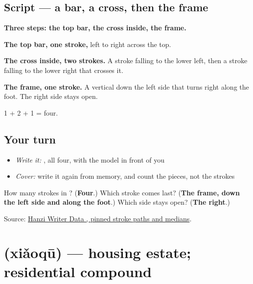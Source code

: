 \subsection*{Script — a bar, a cross, then the frame}

\begin{quote}
\end{quote}

\textbf{Three steps: the top bar, the cross inside, the frame.}

\textbf{The top bar, one stroke,} left to right across the top.

\textbf{The cross inside, two strokes.} A stroke falling to the lower left, then a stroke falling to the lower right that crosses it.

\textbf{The frame, one stroke.} A vertical down the left side that turns right along the foot. The right side stays open.

1 + 2 + 1 = four.

\subsection*{Your turn}
\begin{itemize}
\raggedright
  \item \emph{Write it:} , all four, with the model in front of you
  \item \emph{Cover:} write it again from memory, and count the pieces, not the strokes
\end{itemize}

\begin{tcolorbox}[breakable,colback=teal!4,colframe=teal!35!black,title={Before you move on}]
How many strokes in ? (\textbf{Four}.) Which stroke comes last? (\textbf{The frame, down the left side and along the foot}.) Which side stays open? (\textbf{The right}.)

Source: \href{https://raw.githubusercontent.com/chanind/hanzi-writer-data/68d10a4b21150cae5e1ebbd223eed289cf32d90c/data/\%E5\%8C\%BA.json}{Hanzi Writer Data , pinned stroke paths and medians}.
\end{tcolorbox}
\section[\texorpdfstring{\zh{小区} (xiǎoqū)}{小区 (xiǎoqū)}]{ (xiǎoqū) — housing estate; residential compound}

